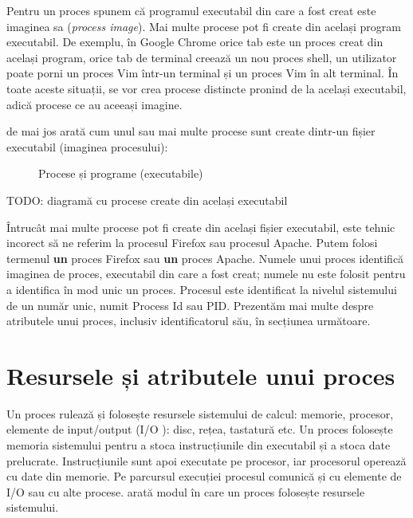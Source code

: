 Pentru un proces spunem că programul executabil din care a fost creat este
imaginea sa (\textit{process image}). Mai multe procese pot fi create din
același program executabil. De exemplu, în Google Chrome orice tab este un
proces creat din același program, orice tab de terminal creează un nou proces
shell, un utilizator poate porni un proces Vim într-un terminal și un proces Vim
în alt terminal. În toate aceste situații, se vor crea procese distincte pronind
de la același executabil, adică procese ce au aceeași imagine.

 de mai jos arată cum unul sau mai multe procese sunt create dintr-un
fișier executabil (imaginea procesului):

\begin{figure}[!htbp]
	\centering
        \def\svgwidth{0.8\textwidth}
        
        \caption{Procese și programe (executabile)}
        \label{fig:process-process-exec}
\end{figure}
TODO: diagramă cu procese create din același executabil

Întrucât mai multe procese pot fi create din același fișier executabil, este
tehnic incorect să ne referim la procesul Firefox sau procesul Apache. Putem
folosi termenul \textbf{un} proces Firefox sau \textbf{un} proces Apache. Numele
unui proces identifică imaginea de proces, executabil din care a fost creat;
numele nu este folosit pentru a identifica în mod unic un proces. Procesul este
identificat la nivelul sistemului de un număr unic, numit Process Id sau PID. Prezentăm mai multe despre atributele unui proces,
inclusiv identificatorul său, în secțiunea următoare.

\section{Resursele și atributele unui proces}
\label{sec:procese-resurse}

Un proces rulează și folosește resursele sistemului de calcul: memorie,
procesor, elemente de input/output (I/O ): disc,
rețea, tastatură etc. Un proces folosește memoria sistemului pentru a stoca
instrucțiunile din executabil și a stoca date prelucrate. Instrucțiunile sunt
apoi executate pe procesor, iar procesorul operează cu date din memorie. Pe
parcursul execuției procesul comunică și cu elemente de I/O sau cu alte procese.
 arată modul în care un proces folosește resursele
sistemului.

